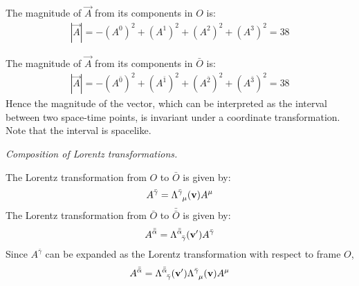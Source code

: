 \documentclass{report}
\begin{document}
\begin{subquests}
\begin{subquests}
		\item		
		The magnitude of ${\vec A}$ from its components in $O$ is:
		\begin{gather*}
			|{\vec A}| = -(A^{0})^2 + (A^{1})^2 +(A^{2})^2 +(A^{3})^2 = 38
		\end{gather*}

		\item
		The magnitude of ${\vec A}$ from its components in $\bar{O}$ is:
		\begin{gather*}
			|{\vec A}| = -(A^{\bar{0}})^2 + (A^{\bar{1}})^2 +(A^{\bar{2}})^2 +(A^{\bar{3}})^2 = 38
		\end{gather*}
		Hence the magnitude of the vector, which can be interpreted as the interval between two space-time points, is invariant under a coordinate transformation. Note that the interval is spacelike.
	\end{subquests}

	\item \emph{Composition of Lorentz transformations.}
	\begin{subquests}
		\item
		The Lorentz transformation from $O$ to $\bar{O}$ is given by:
		\begin{gather*}
			A^{\bar{\gamma}}=\Lambda^{\bar{\gamma}}_{\;\;\mu}({\vb v})A^{\mu} 
		\end{gather*}
		The Lorentz transformation from $\bar O$ to $\bar{\bar{O}}$ is given by:
		\begin{gather*}
			A^{\bar{\bar{\alpha}}} = \Lambda^{\bar{\bar{\alpha}}}_{\;\;\bar{\gamma}}({\vb v'})A^{\bar{\gamma}} 
		\end{gather*}
		Since $A^{\bar{\gamma}}$ can be expanded as the Lorentz transformation with respect to frame $O$,
		\begin{gather*}
			A^{\bar{\bar{\alpha}}} = \Lambda^{\bar{\bar{\alpha}}}_{\;\;\bar{\gamma}}({\vb v'})\Lambda^{\bar{\gamma}}_{\;\;\mu}({\vb v})A^{\mu}
		\end{gather*}


\end{subquests}
\end{subquests}
\end{document}
